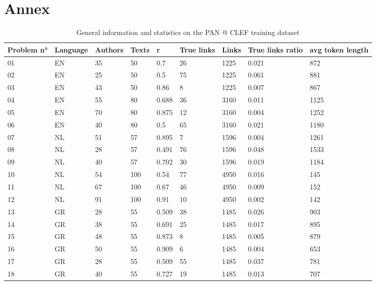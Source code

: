 \section{Annex}
\begin{table*}[h]
  \caption{General information and statistics on the PAN @ CLEF training dataset}
  \label{tab:pan_datasets}
  \begin{tabular}{|l|l|l|l|l|l|l|l|l|}
    \hline
    \textbf{Problem n°} &
    \textbf{Language} &
    \textbf{Authors} &
    \textbf{Texts} &
    \textbf{r} &
    \textbf{True links} &
    \textbf{Links} &
    \textbf{True links ratio} &
    \textbf{avg token length} \\ \hline
      01 & EN & 35 & 50 & 0.7 & 26 & 1225 & 0.021 & 872 \\ \hline
      02 & EN & 25 & 50 & 0.5 & 75 & 1225 & 0.061 & 881 \\ \hline
      03 & EN & 43 & 50 & 0.86 & 8 & 1225 & 0.007 & 867 \\ \hline
      04 & EN & 55 & 80 & 0.688 & 36 & 3160 & 0.011 & 1125 \\ \hline
      05 & EN & 70 & 80 & 0.875 & 12 & 3160 & 0.004 & 1252 \\ \hline
      06 & EN & 40 & 80 & 0.5 & 65 & 3160 & 0.021 & 1180 \\ \hline
      07 & NL & 51 & 57 & 0.895 & 7 & 1596 & 0.004 & 1261 \\ \hline
      08 & NL & 28 & 57 & 0.491 & 76 & 1596 & 0.048 & 1533 \\ \hline
      09 & NL & 40 & 57 & 0.702 & 30 & 1596 & 0.019 & 1184 \\ \hline
      10 & NL & 54 & 100 & 0.54 & 77 & 4950 & 0.016 & 145 \\ \hline
      11 & NL & 67 & 100 & 0.67 & 46 & 4950 & 0.009 & 152 \\ \hline
      12 & NL & 91 & 100 & 0.91 & 10 & 4950 & 0.002 & 142 \\ \hline
      13 & GR & 28 & 55 & 0.509 & 38 & 1485 & 0.026 & 903 \\ \hline
      14 & GR & 38 & 55 & 0.691 & 25 & 1485 & 0.017 & 895 \\ \hline
      15 & GR & 48 & 55 & 0.873 & 8 & 1485 & 0.005 & 879 \\ \hline
      16 & GR & 50 & 55 & 0.909 & 6 & 1485 & 0.004 & 653 \\ \hline
      17 & GR & 28 & 55 & 0.509 & 55 & 1485 & 0.037 & 781 \\ \hline
      18 & GR & 40 & 55 & 0.727 & 19 & 1485 & 0.013 & 707 \\ \hline
  \end{tabular}
\end{table*}
